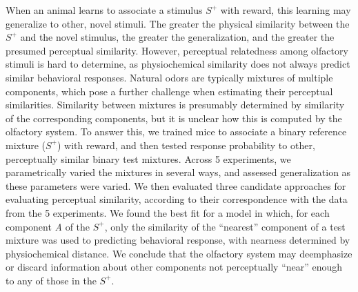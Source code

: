 When an animal learns to associate a stimulus $S^+$ with reward, this learning may generalize to other, novel stimuli. 
The greater the physical similarity between the $S^+$ and the novel stimulus, the greater the generalization, and the greater the presumed perceptual similarity. 
However, perceptual relatedness among olfactory stimuli is hard to determine, as physiochemical similarity does not always predict similar behavioral responses. 
Natural odors are typically mixtures of multiple components, which pose a further challenge when estimating their perceptual similarities.  
Similarity between mixtures is presumably determined by similarity of the corresponding components, but it is unclear how this is computed by the olfactory system.  
To answer this, we trained mice to associate a binary reference mixture ($S^+$) with reward, and then tested response probability to other, perceptually similar binary test mixtures.  
Across 5 experiments, we parametrically varied the mixtures in several ways, and assessed generalization as these parameters were varied.  
We then evaluated three candidate approaches for evaluating perceptual similarity, according to their correspondence with the data from the 5 experiments.  
We found the best fit for a model in which, for each component \textit{A} of the $S^+$, only the similarity of the ``nearest'' component  of a test mixture was used to predicting behavioral response, with nearness determined by physiochemical distance.  
We conclude that the olfactory system may deemphasize or discard information about other components not perceptually ``near'' enough to any of those in the $S^+$.